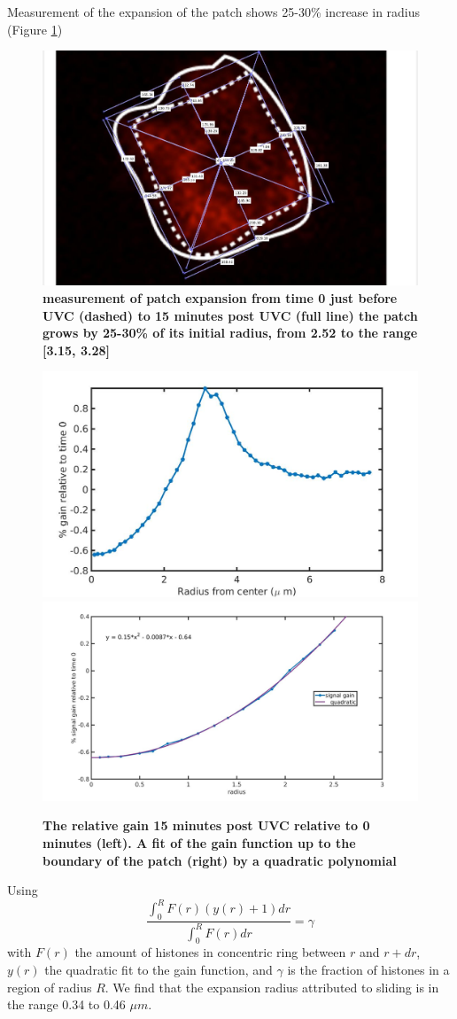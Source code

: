 \documentclass[12pt]{report}
\begin{document}
		Measurement of the expansion of the patch shows 25-30\% increase in radius (Figure \ref{fig:patchExpansionMeasurement})
		\begin{figure}[H]
			\centering
			\includegraphics[width=0.5\linewidth, height=0.3\textheight]{Images/PatchExpansion/patchExpansionMeasurement}
			\caption{\tiny{\textbf{measurement of patch expansion from time 0  just before UVC (dashed) to 15 minutes post UVC (full line) the patch grows by 25-30\% of its initial radius, from 2.52 to the range [3.15,  3.28] }}}
			\label{fig:patchExpansionMeasurement}
		\end{figure}
		
		
		\begin{figure}[H]
			\includegraphics[width=0.5\linewidth, height=0.3\textheight]{Images/PatchExpansion/relativeGainNucleosomesConcentric}
			\includegraphics[width=0.5\linewidth, height=0.3\textheight]{Images/PatchExpansion/nucleosomeSignalGainConcentricFit}
			\caption{\tiny{\textbf{The relative gain 15 minutes post UVC relative to 0 minutes (left). A fit of the gain function up to the boundary of the patch (right) by a quadratic polynomial}}}
			\label{fig:relativeGainNucleosomesConcentric}
		\end{figure}
		
		Using 		
		\begin{equation}\label{eq:HistonePreservationConcentric}
		\frac{\int_0^RF(r)(y(r)+1)dr}{\int_0^RF(r)dr} =\gamma
		\end{equation} 
		with $F(r)$ the amount of histones in concentric ring between $r$ and $r+dr$, $y(r)$ the quadratic fit to the gain function, and $\gamma$ is the fraction of histones in a region of radius $R$. We find that the expansion radius attributed to sliding is in the range 0.34 to 0.46 $\mu m$.  
		
\end{document}
